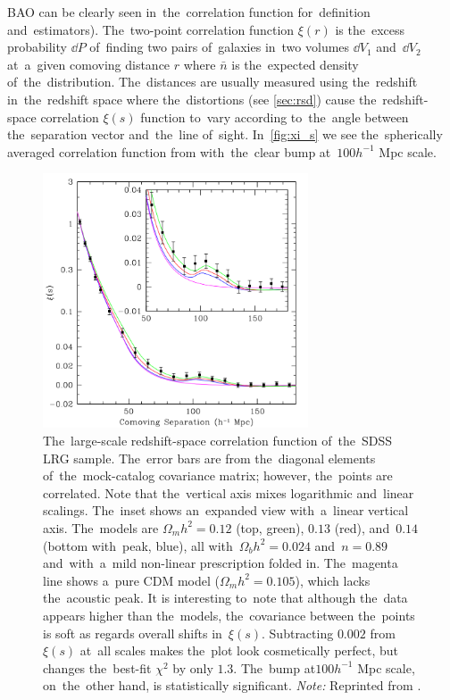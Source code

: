 BAO can be clearly seen in~the~correlation function \parencite[see e.g.][]{1993ApJ...412...64L} for~definition and~estimators). The~two-point correlation function $\xi(r)$ is the~excess probability $\dd P$ of~finding two pairs of~galaxies in~two volumes $\dd V_1$ and~$\dd V_2$ at~a~given comoving distance $r$
where $\bar{n}$ is the~expected density of~the~distribution. The~distances are usually measured using the~redshift in~the~redshift space where the~distortions (see \autoref{sec:rsd}) cause the~redshift-space correlation $\xi(s)$ function to~vary according to~the~angle between the~separation vector and~the~line of~sight. In~\autoref{fig:xi_s} we see the~spherically averaged correlation function from \textcite{2005ApJ...633..560E} with~the~clear bump at~$100h^{-1}$ Mpc scale.
\begin{figure}[!hbt]
    \centering
    \includegraphics[width=0.7\textwidth]{cosmo_evol/bao_rsd.png}
    \caption{The~large-scale redshift-space correlation function of~the~SDSS LRG sample. The~error bars are from the~diagonal elements of~the~mock-catalog covariance matrix; however, the~points are correlated. Note that the~vertical axis mixes logarithmic and~linear scalings. The~inset shows an~expanded view with~a~linear vertical axis. The~models are $\Omega_mh^2=0.12$ (top, green), $0.13$ (red), and~$0.14$ (bottom with~peak, blue), all with~$\Omega_bh^2=0.024$ and~$n=0.89$ and~with~a~mild non-linear prescription folded in. The~magenta line shows a~pure CDM model ($\Omega_mh^2=0.105$), which lacks the~acoustic peak. It is interesting to~note that although the~data appears higher than the~models, the~covariance between the~points is soft as regards overall shifts in~$\xi(s)$. Subtracting $0.002$ from $\xi(s)$ at~all scales makes the~plot look cosmetically perfect, but changes the~best-fit $\chi^2$ by only $1.3$. The~bump at$100h^{-1}$ Mpc scale, on~the~other hand, is statistically significant. \textit{Note:} Reprinted from \textcite{2005ApJ...633..560E}.}
    \label{fig:xi_s}
\end{figure}

